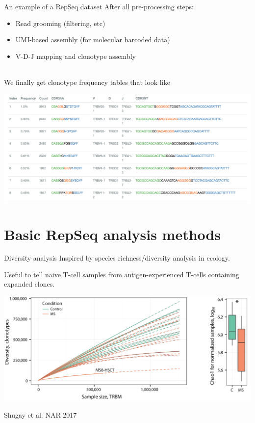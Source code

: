 \documentclass[12pt]{beamer}
\begin{document}
\begin{frame}{An example of a RepSeq dataset}
After all pre-processing steps:
\begin{itemize}
\item Read grooming (filtering, etc)
\item UMI-based assembly (for molecular barcoded data)
\item V-D-J mapping and clonotype assembly\\~\
\end{itemize}

\pause
We finally get clonotype frequency tables that look like
\begin{center}
\includegraphics[width=\textwidth]{p6}
\end{center}
\end{frame}

\section{Basic RepSeq analysis methods}

\begin{frame}{Diversity analysis}
Inspired by species richness/diversity analysis in ecology. 

Useful to tell naive T-cell samples from antigen-experienced T-cells containing expanded clones.

\begin{center}
\includegraphics[scale=0.25]{p10}
\end{center}
\tiny{Shugay et al. NAR 2017}
\end{frame}
\end{document}
